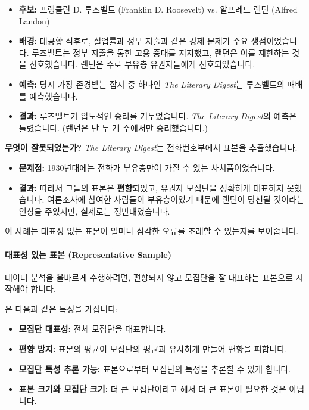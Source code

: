 \documentclass[11pt,a4paper]{article}
\begin{document}
\begin{tcolorbox}[mybox, title={1936년 미국 대통령 선거 (1936 Presidential Election)}]
\begin{itemize}
    \item \textbf{후보:} 프랭클린 D. 루즈벨트 (Franklin D. Roosevelt) vs. 알프레드 랜던 (Alfred Landon)
    \item \textbf{배경:} 대공황 직후로, 실업률과 정부 지출과 같은 경제 문제가 주요 쟁점이었습니다. 루즈벨트는 정부 지출을 통한 고용 증대를 지지했고, 랜던은 이를 제한하는 것을 선호했습니다. 랜던은 주로 부유층 유권자들에게 선호되었습니다.
    \item \textbf{예측:} 당시 가장 존경받는 잡지 중 하나인 \textit{The Literary Digest}는 루즈벨트의 패배를 예측했습니다.
    \item \textbf{결과:} 루즈벨트가 압도적인 승리를 거두었습니다. \textit{The Literary Digest}의 예측은 틀렸습니다. (랜던은 단 두 개 주에서만 승리했습니다.)
\end{itemize}
\end{tcolorbox}

\begin{examplebox}
\textbf{무엇이 잘못되었는가?}
\textit{The Literary Digest}는 전화번호부에서 표본을 추출했습니다.
\begin{itemize}
    \item \textbf{문제점:} 1930년대에는 전화가 부유층만이 가질 수 있는 사치품이었습니다.
    \item \textbf{결과:} 따라서 그들의 표본은 \textbf{편향}되었고, 유권자 모집단을 정확하게 대표하지 못했습니다. 여론조사에 참여한 사람들이 부유층이었기 때문에 랜던이 당선될 것이라는 인상을 주었지만, 실제로는 정반대였습니다.
\end{itemize}
이 사례는 대표성 없는 표본이 얼마나 심각한 오류를 초래할 수 있는지를 보여줍니다.
\end{examplebox}

\paragraph{대표성 있는 표본 (Representative Sample)}
데이터 분석을 올바르게 수행하려면, 편향되지 않고 모집단을 잘 대표하는 표본으로 시작해야 합니다.

\begin{tcolorbox}[mybox, title={대표성 있는 표본 (Representative Sample)}]
은 다음과 같은 특징을 가집니다:
\begin{itemize}
    \item \textbf{모집단 대표성:} 전체 모집단을 대표합니다.
    \item \textbf{편향 방지:} 표본의 평균이 모집단의 평균과 유사하게 만들어 편향을 피합니다.
    \item \textbf{모집단 특성 추론 가능:} 표본으로부터 모집단의 특성을 추론할 수 있게 합니다.
    \item \textbf{표본 크기와 모집단 크기:} 더 큰 모집단이라고 해서 더 큰 표본이 필요한 것은 아닙니다.
\end{itemize}
\end{tcolorbox}
\end{document}
